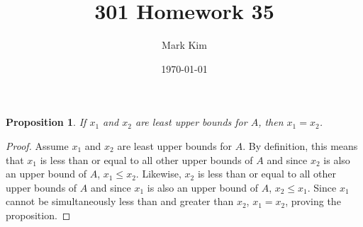 \documentclass[12pt]{amsart}
\title{301 Homework 35}
\author{Mark Kim}
\date{\today}
\newtheorem*{proposition}{Proposition}
\begin{document}
\maketitle

\begin{proposition}
If $x_1$ and $x_2$ are least upper bounds for $A$, then $x_1=x_2$.
\end{proposition}

\begin{proof}
Assume $x_1$ and $x_2$ are least upper bounds for $A$.  By definition, this means that $x_1$ is less than or equal to all other upper bounds of $A$ and since $x_2$ is also an upper bound of $A$, $x_1 \leq x_2$.  Likewise, $x_2$ is less than or equal to all other upper bounds of $A$ and since $x_1$ is also an upper bound of $A$, $x_2 \leq x_1$.  Since $x_1$ cannot be simultaneously less than and greater than $x_2$, $x_1=x_2$, proving the proposition.
\end{proof}
\end{document}
